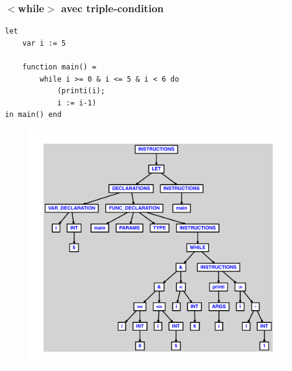 \documentclass{article}
\begin{document}
\subsubsection{$ < $while$ > $ avec triple-condition}
\begin{lstlisting}
let
	var i := 5

	function main() =
		while i >= 0 & i <= 5 & i < 6 do
			(printi(i);
			i := i-1)
in main() end
\end{lstlisting}
\newpage
\begin{figure}[H]
\centering
\includegraphics[max width=\textwidth]{ast/ast_332.pdf}
\end{figure}
\newpage
\end{document}
